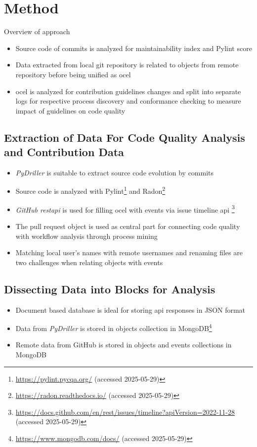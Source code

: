 \chapter{Method}
\label{chap:method}
Overview of approach
\begin{itemize}
	\item Source code of commits is analyzed for maintainability index and Pylint score
	\item Data extracted from local git repository is related to objects from remote repository before being unified as \ac{ocel}
	\item \ac{ocel} is analyzed for contribution guidelines changes and split into separate logs for respective process discovery and conformance checking to measure impact of guidelines on code quality
\end{itemize}

\section{Extraction of Data For Code Quality Analysis and Contribution Data}
\begin{itemize}
	\item \emph{PyDriller} is suitable to extract source code evolution by commits
	\item Source code is analyzed with Pylint\footnote{\url{https://pylint.pycqa.org/} (accessed 2025-05-29)} and Radon\footnote{\url{https://radon.readthedocs.io/} (accessed 2025-05-29)}
	\item \emph{GitHub \ac{restapi}} is used for filling \ac{ocel} with events via issue timeline \ac{api} \footnote{\url{https://docs.github.com/en/rest/issues/timeline?apiVersion=2022-11-28} (accessed 2025-05-29)}
	\item The pull request object is used as central part for connecting code quality with workflow analysis through process mining
	\item Matching local user's names with remote usernames and renaming files are two challenges when relating objects with events
\end{itemize}

\section{Dissecting Data into Blocks for Analysis}
\begin{itemize}
	\item Document based database is ideal for storing \ac{api} responses in JSON format
	\item Data from \emph{PyDriller} is stored in objects collection in MongoDB\footnote{\url{https://www.mongodb.com/docs/} (accessed 2025-05-29)}
	\item Remote data from GitHub is stored in objects and events collections in MongoDB
\end{itemize}

